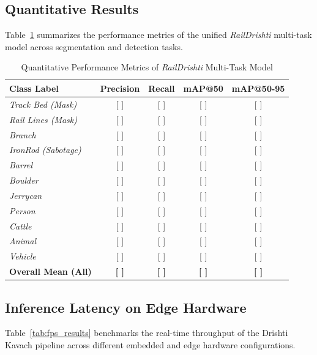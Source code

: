 \documentclass[conference]{IEEEtran}
\begin{document}
\subsection{Quantitative Results}
Table~\ref{tab:detection_results} summarizes the performance metrics of the unified \textit{RailDrishti} multi-task model across segmentation and detection tasks.

\begin{table}[h]
\centering
\caption{Quantitative Performance Metrics of \textit{RailDrishti} Multi-Task Model}
\label{tab:detection_results}
\begin{tabular}{l c c c c}
\toprule
\textbf{Class Label} & \textbf{Precision} & \textbf{Recall} & \textbf{mAP@50} & \textbf{mAP@50-95} \\
\midrule
\textit{Track Bed (Mask)} & [ ] & [ ] & [ ] & [ ] \\
\textit{Rail Lines (Mask)} & [ ] & [ ] & [ ] & [ ] \\
\textit{Branch} & [ ] & [ ] & [ ] & [ ] \\
\textit{IronRod (Sabotage)} & [ ] & [ ] & [ ] & [ ] \\
\textit{Barrel} & [ ] & [ ] & [ ] & [ ] \\
\textit{Boulder} & [ ] & [ ] & [ ] & [ ] \\
\textit{Jerrycan} & [ ] & [ ] & [ ] & [ ] \\
\textit{Person} & [ ] & [ ] & [ ] & [ ] \\
\textit{Cattle} & [ ] & [ ] & [ ] & [ ] \\
\textit{Animal} & [ ] & [ ] & [ ] & [ ] \\
\textit{Vehicle} & [ ] & [ ] & [ ] & [ ] \\
\midrule
\textbf{Overall Mean (All)} & \textbf{[ ]} & \textbf{[ ]} & \textbf{[ ]} & \textbf{[ ]} \\
\bottomrule
\end{tabular}
\end{table}

\subsection{Inference Latency on Edge Hardware}
Table~\ref{tab:fps_results} benchmarks the real-time throughput of the Drishti Kavach pipeline across different embedded and edge hardware configurations.
\end{document}
